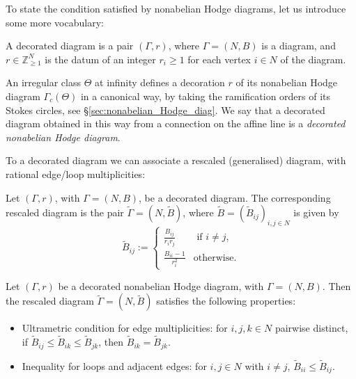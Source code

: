 \documentclass[11pt,a4paper]{amsart}
\numberwithin{equation}{section}
\begin{document}
To state the condition satisfied by nonabelian Hodge diagrams, let us introduce some more vocabulary:

\begin{definition} A decorated diagram is a pair $(\Gamma, r)$, where $\Gamma=(N, B)$ is a diagram, and $r\in \mathbb Z_{\geq 1}^N$ is the datum of an integer $r_i\geq 1$ for each vertex $i\in N$ of the diagram. 
\end{definition}

An irregular class $\Theta$ at infinity defines a decoration $r$ of its nonabelian Hodge diagram $\Gamma_c(\Theta)$ in a canonical way, by taking the ramification orders of its Stokes circles, see §\ref{sec:nonabelian_Hodge_diag}. We say that a decorated diagram obtained in this way from a connection on the affine line is a \emph{decorated nonabelian Hodge diagram}.


To a decorated diagram we can associate a rescaled (generalised) diagram, with rational edge/loop multiplicities:

\begin{definition}
Let $(\Gamma, r)$, with $\Gamma=(N,B)$, be a decorated diagram. The corresponding rescaled diagram is the pair $\widetilde\Gamma=(N, \widetilde B)$, where $\widetilde B=(\widetilde B_{ij})_{i,j\in N}$ is given by
\begin{equation}
\widetilde B_{ij}:=\left\lbrace 
\begin{array}{cc}
\frac{B_{ij}}{r_i r_j} & \text{ if } i\neq j,\\
\frac{B_{ii}-1}{r_i^2} & \text{otherwise.}
\end{array}
\right.
\end{equation}
\end{definition}



\begin{theorem}
\label{thm:rescaled_nah_diagram_necessary_condition_intro}
Let $(\Gamma,r)$ be a decorated nonabelian Hodge diagram, with $\Gamma=(N,B)$. Then the rescaled diagram $\widetilde \Gamma=(N, \widetilde B)$ satisfies the following properties:
\begin{itemize}
\item  Ultrametric condition for edge multiplicities: for $i,j,k\in N$ pairwise distinct, if $\widetilde B_{ij}\leq \widetilde B_{ik}\leq \widetilde B_{jk}$, then $\widetilde B_{ik}=\widetilde B_{jk}$.
\item Inequality for loops and adjacent edges: for $i,j\in N$ with $i\neq j$, $\widetilde B_{ii}\leq \widetilde B_{ij}$.
\end{itemize}
\end{theorem}
\end{document}
